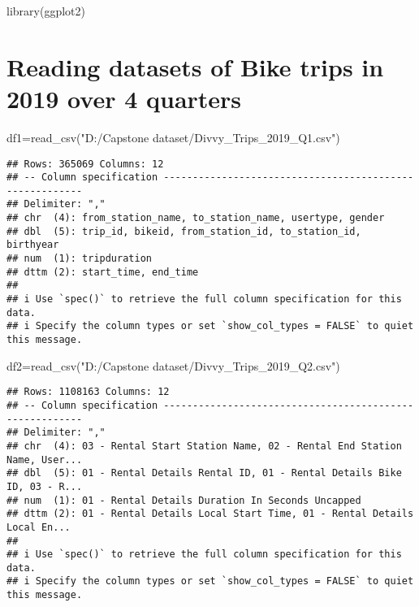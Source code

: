 \documentclass[
]{article}
\newenvironment{Shaded}{\begin{snugshade}}{\end{snugshade}}
\newcommand{\FunctionTok}[1]{\textcolor[rgb]{0.00,0.00,0.00}{#1}}
\newcommand{\NormalTok}[1]{#1}
\newcommand{\OtherTok}[1]{\textcolor[rgb]{0.56,0.35,0.01}{#1}}
\newcommand{\StringTok}[1]{\textcolor[rgb]{0.31,0.60,0.02}{#1}}
\begin{document}
\begin{Shaded}
\begin{Highlighting}[]
\FunctionTok{library}\NormalTok{(ggplot2)}
\end{Highlighting}
\end{Shaded}

\hypertarget{reading-datasets-of-bike-trips-in-2019-over-4-quarters}{%
\section{Reading datasets of Bike trips in 2019 over 4
quarters}\label{reading-datasets-of-bike-trips-in-2019-over-4-quarters}}

\begin{Shaded}
\begin{Highlighting}[]
\NormalTok{df1}\OtherTok{=}\FunctionTok{read\_csv}\NormalTok{(}\StringTok{"D:/Capstone dataset/Divvy\_Trips\_2019\_Q1.csv"}\NormalTok{)}
\end{Highlighting}
\end{Shaded}

\begin{verbatim}
## Rows: 365069 Columns: 12
## -- Column specification --------------------------------------------------------
## Delimiter: ","
## chr  (4): from_station_name, to_station_name, usertype, gender
## dbl  (5): trip_id, bikeid, from_station_id, to_station_id, birthyear
## num  (1): tripduration
## dttm (2): start_time, end_time
## 
## i Use `spec()` to retrieve the full column specification for this data.
## i Specify the column types or set `show_col_types = FALSE` to quiet this message.
\end{verbatim}

\begin{Shaded}
\begin{Highlighting}[]
\NormalTok{df2}\OtherTok{=}\FunctionTok{read\_csv}\NormalTok{(}\StringTok{"D:/Capstone dataset/Divvy\_Trips\_2019\_Q2.csv"}\NormalTok{)}
\end{Highlighting}
\end{Shaded}

\begin{verbatim}
## Rows: 1108163 Columns: 12
## -- Column specification --------------------------------------------------------
## Delimiter: ","
## chr  (4): 03 - Rental Start Station Name, 02 - Rental End Station Name, User...
## dbl  (5): 01 - Rental Details Rental ID, 01 - Rental Details Bike ID, 03 - R...
## num  (1): 01 - Rental Details Duration In Seconds Uncapped
## dttm (2): 01 - Rental Details Local Start Time, 01 - Rental Details Local En...
## 
## i Use `spec()` to retrieve the full column specification for this data.
## i Specify the column types or set `show_col_types = FALSE` to quiet this message.
\end{verbatim}
\end{document}
